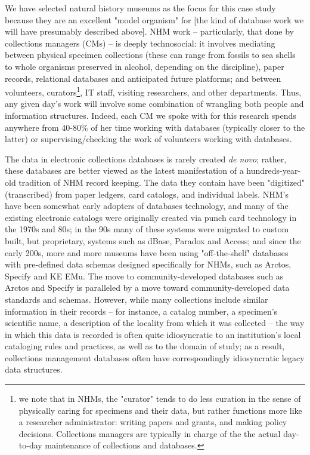 We have selected natural history museums as the focus for this case study because they are an excellent "model organism" for [the kind of database work we will have presumably described above]. NHM work -- particularly, that done by collections managers (CMs) -- is deeply technosocial: it involves mediating between physical specimen collections (these can range from fossils to sea shells to whole organisms preserved in alcohol, depending on the discipline), paper records, relational databases and anticipated future platforms; and between volunteers, curators\footnote{we note that in NHMs, the "curator" tends to do less curation in the sense of physically caring for specimens and their data, but rather functions more like a researcher administrator: writing papers and grants, and making policy decisions. Collections managers are typically in charge of the the actual day-to-day maintenance of collections and databases.}, IT staff, visiting researchers, and other departments. Thus, any given day’s work will involve some combination of wrangling both people and information structures. Indeed, each CM we spoke with for this research spends anywhere from 40-80\% of her time working with databases (typically closer to the latter) or supervising/checking the work of volunteers working with databases.

The data in electronic collections databases is rarely created \textit{de novo}; rather, these databases are better viewed as the latest manifestation of a hundreds-year-old tradition of NHM record keeping. The data they contain have been "digitized" (transcribed) from paper ledgers, card catalogs, and individual labels. NHM's have been somewhat early adopters of databases technology, and many of the existing electronic catalogs were originally created via punch card technology in the 1970s and 80s; in the 90s many of these systems were migrated to custom built, but proprietary, systems such as dBase, Paradox and Access; and since the early 200s, more and more museums have been using "off-the-shelf" databases with pre-defined data schemas designed specifically for NHMs, such as Arctos, Specify and KE EMu. The move to community-developed databases such as Arctos and Specify is paralleled by a move toward community-developed data standards and schemas.  However, while many collections include similar information in their records – for instance, a catalog number, a specimen’s scientific name, a description of the locality from which it was collected – the way in which this data is recorded is often quite idiosyncratic to an institution’s local cataloging rules and practices, as well as to the domain of study; as a result, collections management databases often have correspondingly idiosyncratic legacy data structures.

